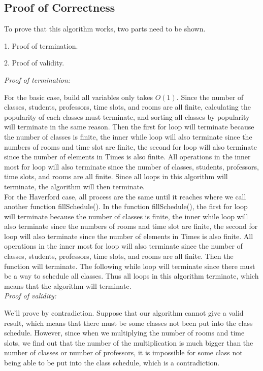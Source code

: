 \documentclass[11pt, oneside]{article}   	%
\begin{document}
\subsection{Proof of Correctness}
To prove that this algorithm works, two parts need to be shown.

1. Proof of termination.

2. Proof of validity.

\textit{Proof of termination:}

For the basic case, build all variables only takes $O(1)$. Since the number of classes, students, professors, time slots, and rooms are all finite, calculating the popularity of each classes must terminate, and sorting all classes by popularity will terminate in the same reason. Then the first for loop will terminate because the number of classes is finite, the inner while loop will also terminate since the numbers of rooms and time slot are finite, the second for loop will also terminate since the number of elements in Times is also finite. All operations in the inner most for loop will also terminate since the number of classes, students, professors, time slots, and rooms are all finite. Since all loops in this algorithm will terminate, the algorithm will then terminate. \\

For the Haverford case, all process are the same until it reaches where we call another function fillSchedule(). In the function fillSchedule(), the first for loop will terminate because the number of classes is finite, the inner while loop will also terminate since the numbers of rooms and time slot are finite, the second for loop will also terminate since the number of elements in Times is also finite. All operations in the inner most for loop will also terminate since the number of classes, students, professors, time slots, and rooms are all finite. Then the function will terminate. The following while loop will terminate since there must be a way to schedule all classes. Thus all loops in this algorithm terminate, which means that the algorithm will terminate. \\

\textit{Proof of validity:}

We'll prove by contradiction. Suppose that our algorithm cannot give a valid result, which means that there must be some classes not been put into the class schedule. However, since when we multiplying the number of rooms and time slots, we find out that the number of the multiplication is much bigger than the number of classes or number of professors, it is impossible for some class not being able to be put into the class schedule, which is a contradiction.
\end{document}
